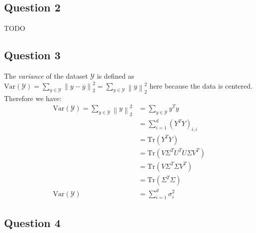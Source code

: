 \documentclass{article}
\begin{document}
\subsection{Question 2}

TODO

\subsection{Question 3}

The \textit{variance} of the dataset $\mathcal{Y}$ is defined as $\text{Var}(\mathcal{Y}) = \sum_{y \in \mathcal{Y}} \left\lVert y - \overline{y} \right\rVert^2_2 = \sum_{y \in \mathcal{Y}} \left\lVert y \right\rVert^2_2$ here because the data is centered. Therefore we have:
\begin{equation}
    \begin{split}
        \text{Var}(\mathcal{Y}) = \sum_{y \in \mathcal{Y}} \left\lVert y \right\rVert^2_2 & = \sum_{y \in \mathcal{Y}} y^T y         \\
                                                                                          & = \sum_{i = 1}^d (Y^T Y)_{i, i}          \\
                                                                                          & = \text{Tr}(Y^T Y)                       \\
                                                                                          & = \text{Tr}(V \Sigma^T U^T U \Sigma V^T) \\
                                                                                          & = \text{Tr}(V \Sigma^T \Sigma V^T)       \\
                                                                                          & = \text{Tr}(\Sigma^T \Sigma)             \\
        \text{Var}(\mathcal{Y})                                                           & = \sum_{i = 1}^d \sigma_i^2
    \end{split}
\end{equation}

\subsection{Question 4}
\end{document}
